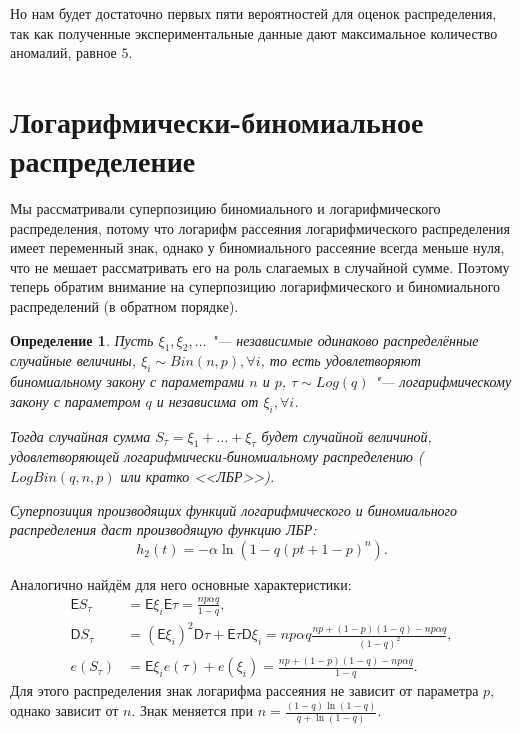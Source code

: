 \documentclass[12pt, specialist, subf, substylefile = spbu.rtx]{disser}
\newtheorem{define}{Определение}
\begin{document}
	Но нам будет достаточно первых пяти вероятностей для оценок распределения, так как полученные экспериментальные данные дают максимальное количество аномалий, равное $ 5 $.
	
	\section{Логарифмически-биномиальное распределение}
	
	\label{LBR}
	
	Мы рассматривали суперпозицию биномиального и логарифмического распределения, потому что логарифм рассеяния логарифмического распределения имеет переменный знак, однако у биномиального рассеяние всегда меньше нуля, что не мешает рассматривать его на роль слагаемых в случайной сумме. Поэтому теперь обратим внимание на суперпозицию логарифмического и биномиального распределений (в обратном порядке).
	
	\begin{define}
		Пусть $\xi _1, \xi _2, \dots$ "--- независимые одинаково распределённые случайные величины, $\xi _i \sim Bin(n, p), \forall i$, то есть удовлетворяют биномиальному закону с параметрами $n$ и $p$, $\tau \sim Log(q)$ "--- логарифмическому закону с параметром $q$ и независима от $\xi _i, \forall i$.
		
		Тогда случайная сумма $S _\tau = \xi _1 + \dots + \xi _\tau$ будет случайной величиной, удовлетворяющей логарифмически-биномиальному распределению ($LogBin(q, n, p)$ или кратко <<ЛБР>>).
		
		Суперпозиция производящих функций логарифмического и биномиального  распределения даст производящую функцию ЛБР:
		\[
			h _2(t) = - \alpha \ln (1 - q (p t + 1 - p) ^n).
		\]
		\label{def:LBR}
	\end{define}
	
	Аналогично найдём для него основные характеристики:
	\[
		\begin{aligned}
		 	\mathsf{E} S _\tau &= \mathsf{E} \xi _i \mathsf{E} \tau = \frac {n p \alpha q} {1 - q},\\
		 	\mathsf{D} S _\tau &= \left( \mathsf{E} \xi _i \right) ^2 \mathsf{D} \tau + \mathsf{E} \tau \mathsf{D} \xi _i = n p \alpha q \frac {np + (1 - p) (1 - q) - n p \alpha q} {(1 - q) ^2},\\
		 	e (S _\tau) &= \mathsf{E} \xi _i e (\tau) + e (\xi _i) = \frac {np + (1 - p) (1 - q) - n p \alpha q} {1 - q}.
		\end{aligned}
	\]
	Для этого распределения знак логарифма рассеяния не зависит от параметра $ p $, однако зависит от $ n $. Знак меняется при $ n = \frac{(1 - q) \ln(1 - q)}{q + \ln(1 - q)} $.
	
\end{document}
